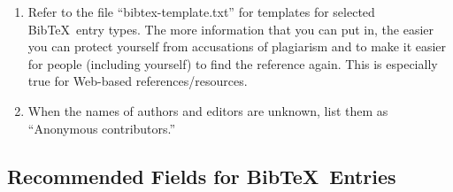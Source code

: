 \documentclass[letter,12pt]{article}
\begin{document}
\begin{enumerate}
\begin{enumerate}
	\item AUTHOR, ``TITLE OF REPOSITORY,'' GitHub, Inc., San Francisco, CA, MONTH DAY, YEAR. Available online from \{$\backslash$it \{GitHub: GitHub USERNAME (or NAME OF ORGANIZATION)\}: at: $\backslash$url\{URL\}; March 16, 2016 was the last accessed date.
	\item AUTHOR, ``TITLE OF PAPER,'' Cornell University, Ithaca, NY, MONTH DAY, YEAR. Available online (as Version XYZ) from \{$\backslash$it \{arXiv: FIELD(s)\}: at: $\backslash$url\{URL\}; March 16, 2016 was the last accessed date.
	\item When {\sc Bib}\TeX\ entries are created for the aforementioned sources of information, populate the appropriate fields so that each information in the aforementioned sources are included in the {\sc Bib}\TeX\ entries.
	\item For other organizations, communities, and groups, use the term ``contributors'' instead of ``members,'' unless otherwise specified.
	\end{enumerate}
\item Refer to the file ``bibtex-template.txt'' for templates for selected {\sc Bib}\TeX\ entry types. The more information that you can put in, the easier you can protect yourself from accusations of plagiarism and to make it easier for people (including yourself) to find the reference again. This is especially true for Web-based references/resources.
\item When the names of authors and editors are unknown, list them as ``Anonymous contributors.''
\end{enumerate}



\subsection{Recommended Fields for {\sc Bib}\TeX\ Entries}
\label{ssec:RecommendedFieldsforBibTeXEntries}
\end{document}
